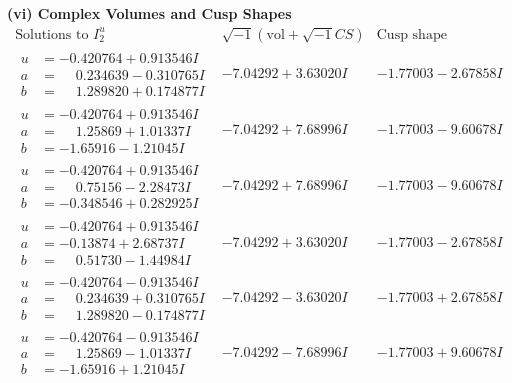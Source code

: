 \documentclass[1p]{elsarticle_modified}
\theoremstyle{definition}
\newcommand{\I}{\sqrt{-1}}
\begin{document}
\newpage\flushleft \textbf{(vi) Complex Volumes and Cusp Shapes}
$$\begin{array}{c|c|c}  
\text{Solutions to }I^u_{2}& \I (\text{vol} + \sqrt{-1}CS) & \text{Cusp shape}\\
 \hline 
\begin{aligned}
u &= -0.420764 + 0.913546 I \\
a &= \phantom{-}0.234639 - 0.310765 I \\
b &= \phantom{-}1.289820 + 0.174877 I\end{aligned}
 & -7.04292 + 3.63020 I & -1.77003 - 2.67858 I \\ \hline\begin{aligned}
u &= -0.420764 + 0.913546 I \\
a &= \phantom{-}1.25869 + 1.01337 I \\
b &= -1.65916 - 1.21045 I\end{aligned}
 & -7.04292 + 7.68996 I & -1.77003 - 9.60678 I \\ \hline\begin{aligned}
u &= -0.420764 + 0.913546 I \\
a &= \phantom{-}0.75156 - 2.28473 I \\
b &= -0.348546 + 0.282925 I\end{aligned}
 & -7.04292 + 7.68996 I & -1.77003 - 9.60678 I \\ \hline\begin{aligned}
u &= -0.420764 + 0.913546 I \\
a &= -0.13874 + 2.68737 I \\
b &= \phantom{-}0.51730 - 1.44984 I\end{aligned}
 & -7.04292 + 3.63020 I & -1.77003 - 2.67858 I \\ \hline\begin{aligned}
u &= -0.420764 - 0.913546 I \\
a &= \phantom{-}0.234639 + 0.310765 I \\
b &= \phantom{-}1.289820 - 0.174877 I\end{aligned}
 & -7.04292 - 3.63020 I & -1.77003 + 2.67858 I \\ \hline\begin{aligned}
u &= -0.420764 - 0.913546 I \\
a &= \phantom{-}1.25869 - 1.01337 I \\
b &= -1.65916 + 1.21045 I\end{aligned}
 & -7.04292 - 7.68996 I & -1.77003 + 9.60678 I \\ \hline\begin{aligned}

\end{aligned}
\end{array}$$
\end{document}

